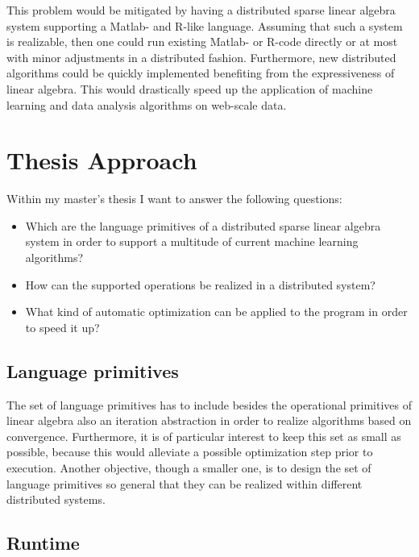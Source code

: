 \documentclass{dima}
\begin{document}
This problem would be mitigated by having a distributed sparse linear algebra system supporting a Matlab- and R-like language.
Assuming that such a system is realizable, then one could run existing Matlab- or R-code directly or at most with minor adjustments in a distributed fashion.
Furthermore, new distributed algorithms could be quickly implemented benefiting from the expressiveness of linear algebra.
This would drastically speed up the application of machine learning and data analysis algorithms on web-scale data.


\section{Thesis Approach}

Within my master's thesis I want to answer the following questions:
\begin{itemize}
\item Which are the language primitives of a distributed sparse linear algebra system in order to support a multitude of current machine learning algorithms?
\item How can the supported operations be realized in a distributed system?
\item What kind of automatic optimization can be applied to the program in order to speed it up?
\end{itemize}

\subsection{Language primitives}

The set of language primitives has to include besides the operational primitives of linear algebra also an iteration abstraction in order to realize algorithms based on convergence.
Furthermore, it is of particular interest to keep this set as small as possible, because this would alleviate a possible optimization step prior to execution.
Another objective, though a smaller one, is to design the set of language primitives so general that they can be realized within different distributed systems.

\subsection{Runtime}
\end{document}
